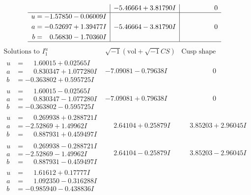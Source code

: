 \documentclass[1p]{elsarticle_modified}
\theoremstyle{definition}
\newcommand{\I}{\sqrt{-1}}
\begin{document}
$$\begin{array}{c|c|c}
 & -5.46664 + 3.81790 I & \phantom{-0.000000 } 0 \\ \hline\begin{aligned}
u &= -1.57850 - 0.06009 I \\
a &= -0.52697 + 1.39477 I \\
b &= \phantom{-}0.56830 - 1.70360 I\end{aligned}
 & -5.46664 - 3.81790 I & \phantom{-0.000000 } 0\\
 \hline 
 \end{array}$$\newpage$$\begin{array}{c|c|c}  
\text{Solutions to }I^u_{1}& \I (\text{vol} + \sqrt{-1}CS) & \text{Cusp shape}\\
 \hline 
\begin{aligned}
u &= \phantom{-}1.60015 + 0.02565 I \\
a &= \phantom{-}0.830347 + 1.077280 I \\
b &= -0.363802 + 0.595725 I\end{aligned}
 & -7.09081 - 0.79638 I & \phantom{-0.000000 } 0 \\ \hline\begin{aligned}
u &= \phantom{-}1.60015 - 0.02565 I \\
a &= \phantom{-}0.830347 - 1.077280 I \\
b &= -0.363802 - 0.595725 I\end{aligned}
 & -7.09081 + 0.79638 I & \phantom{-0.000000 } 0 \\ \hline\begin{aligned}
u &= \phantom{-}0.269938 + 0.288721 I \\
a &= -2.52869 + 1.49962 I \\
b &= \phantom{-}0.887931 + 0.459497 I\end{aligned}
 & \phantom{-}2.64104 + 0.25879 I & \phantom{-}3.85203 + 2.96045 I \\ \hline\begin{aligned}
u &= \phantom{-}0.269938 - 0.288721 I \\
a &= -2.52869 - 1.49962 I \\
b &= \phantom{-}0.887931 - 0.459497 I\end{aligned}
 & \phantom{-}2.64104 - 0.25879 I & \phantom{-}3.85203 - 2.96045 I \\ \hline\begin{aligned}
u &= \phantom{-}1.61612 + 0.17777 I \\
a &= \phantom{-}1.092350 - 0.316288 I \\
b &= -0.985940 - 0.438836 I\end{aligned}

\end{array}$$
\end{document}
